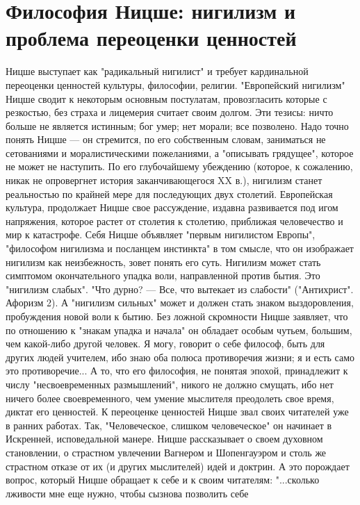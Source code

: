 \documentclass[12pt]{article}
\begin{document}
\section{Философия Ницше: нигилизм и проблема переоценки ценностей}
Ницше  выступает  как  "радикальный  нигилист"  и  требует  кардинальной  переоценки  ценностей  культуры,
философии,  религии.  "Европейский  нигилизм"  Ницше  сводит  к  некоторым  основным  постулатам,
провозгласить которые с резкостью, без страха и лицемерия считает своим долгом. Эти тезисы: ничто больше не
является истинным; бог умер; нет морали; все позволено. Надо точно понять Ницше — он стремится, по его
собственным словам, заниматься не сетованиями и моралистическими пожеланиями, а "описывать грядущее",
которое не может не наступить. По его глубочайшему убеждению (которое, к сожалению, никак не опровергнет
история заканчивающегося XX в.), нигилизм станет реальностью по крайней мере для последующих двух
столетий.  Европейская  культура,  продолжает  Ницше  свое  рассуждение,  издавна  развивается  под  игом
напряжения, которое растет от столетия к столетию, приближая человечество и мир к катастрофе. Себя Ницше
объявляет "первым нигилистом Европы", "философом нигилизма и посланцем инстинкта" в том смысле, что он
изображает  нигилизм  как  неизбежность,  зовет  понять  его  суть.  Нигилизм  может  стать  симптомом
окончательного упадка воли, направленной против бытия. Это "нигилизм слабых". "Что дурно? — Все, что
вытекает  из  слабости"  ("Антихрист".  Афоризм  2).  А  "нигилизм  сильных"  может  и  должен  стать  знаком
выздоровления, пробуждения новой воли к бытию. Без ложной скромности Ницше заявляет, что по отношению
к "знакам упадка и начала" он обладает особым чутьем, большим, чем какой-либо другой человек. Я могу,
говорит о себе философ, быть для других людей учителем, ибо знаю оба полюса противоречия жизни; я и есть
само это противоречие... А то, что его философия, не понятая эпохой, принадлежит к числу "несвоевременных
размышлений", никого  не должно  смущать, ибо нет ничего  более  своевременного,  чем умение мыслителя
преодолеть свое время, диктат его ценностей. К переоценке ценностей Ницше звал своих читателей уже в
ранних работах. Так, "Человеческое, слишком человеческое" он начинает в Искренней, исповедальной манере.
Ницше рассказывает о своем духовном становлении, о страстном увлечении Вагнером и Шопенгауэром и столь
же страстном отказе от их (и других мыслителей) идей и доктрин. А это порождает вопрос, который Ницше
обращает к себе и к своим читателям: "...сколько лживости мне еще нужно, чтобы сызнова позволить себе
\end{document}
